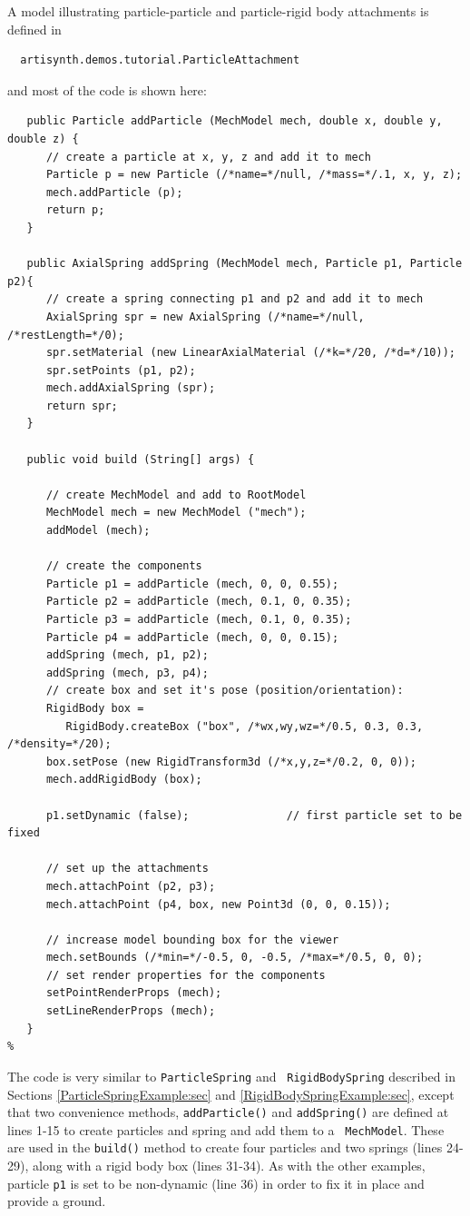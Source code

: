 A model illustrating particle-particle and particle-rigid body attachments
is defined in
%
\begin{verbatim}
  artisynth.demos.tutorial.ParticleAttachment
\end{verbatim}
%
and most of the code is shown here:
%
\lstset{numbers=left}
\begin{lstlisting}
   public Particle addParticle (MechModel mech, double x, double y, double z) {
      // create a particle at x, y, z and add it to mech
      Particle p = new Particle (/*name=*/null, /*mass=*/.1, x, y, z);
      mech.addParticle (p);
      return p;
   }

   public AxialSpring addSpring (MechModel mech, Particle p1, Particle p2){
      // create a spring connecting p1 and p2 and add it to mech
      AxialSpring spr = new AxialSpring (/*name=*/null, /*restLength=*/0);
      spr.setMaterial (new LinearAxialMaterial (/*k=*/20, /*d=*/10));
      spr.setPoints (p1, p2);
      mech.addAxialSpring (spr);
      return spr;
   }

   public void build (String[] args) {

      // create MechModel and add to RootModel
      MechModel mech = new MechModel ("mech");
      addModel (mech);

      // create the components
      Particle p1 = addParticle (mech, 0, 0, 0.55);
      Particle p2 = addParticle (mech, 0.1, 0, 0.35);
      Particle p3 = addParticle (mech, 0.1, 0, 0.35);
      Particle p4 = addParticle (mech, 0, 0, 0.15);
      addSpring (mech, p1, p2);
      addSpring (mech, p3, p4);
      // create box and set it's pose (position/orientation):
      RigidBody box =
         RigidBody.createBox ("box", /*wx,wy,wz=*/0.5, 0.3, 0.3, /*density=*/20);
      box.setPose (new RigidTransform3d (/*x,y,z=*/0.2, 0, 0));
      mech.addRigidBody (box);

      p1.setDynamic (false);               // first particle set to be fixed

      // set up the attachments
      mech.attachPoint (p2, p3);
      mech.attachPoint (p4, box, new Point3d (0, 0, 0.15));

      // increase model bounding box for the viewer
      mech.setBounds (/*min=*/-0.5, 0, -0.5, /*max=*/0.5, 0, 0);  
      // set render properties for the components
      setPointRenderProps (mech);
      setLineRenderProps (mech);
   }
%
\end{lstlisting}
\lstset{numbers=none}

The code is very similar to {\tt ParticleSpring} and {\tt
RigidBodySpring} described in Sections \ref{ParticleSpringExample:sec}
and \ref{RigidBodySpringExample:sec}, except that two convenience
methods, {\tt addParticle()} and {\tt addSpring()} are defined at
lines 1-15 to create particles and spring and add them to a {\tt
MechModel}. These are used in the {\tt build()} method to create four
particles and two springs (lines 24-29), along with a rigid body box
(lines 31-34). As with the other examples, particle {\tt p1} is set to
be non-dynamic (line 36) in order to fix it in place and provide a
ground.

